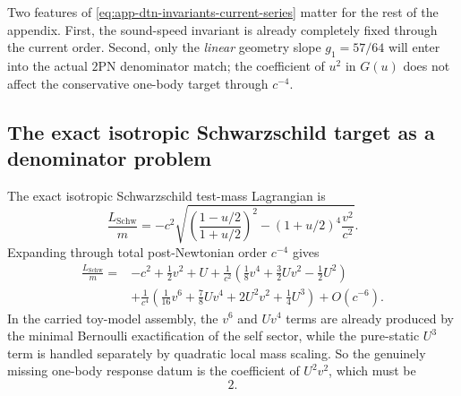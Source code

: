 \documentclass[11pt]{article}
\newcommand{\TwoPN}{\mathrm{2PN}}
\begin{document}
Two features of \cref{eq:app-dtn-invariants-current-series} matter for the rest of the
appendix.  First, the sound-speed invariant is already completely fixed through the
current order.  Second, only the \emph{linear} geometry slope \(g_1=57/64\) will enter
into the actual \(\TwoPN\) denominator match; the coefficient of \(u^2\) in
\(G(u)\) does not affect the conservative one-body target through \(c^{-4}\).

\subsection{The exact isotropic Schwarzschild target as a denominator problem}
\label{app:one-body-dtn-target}

The exact isotropic Schwarzschild test-mass Lagrangian is
\begin{equation}
\frac{L_{\mathrm{Schw}}}{m}
=-c^2\sqrt{\left(\frac{1-u/2}{1+u/2}\right)^2-(1+u/2)^4\frac{v^2}{c^2}}.
\label{eq:app-dtn-schwarzschild-exact}
\end{equation}
Expanding through total post-Newtonian order \(c^{-4}\) gives
\begin{align}
\frac{L_{\mathrm{Schw}}}{m}
={}&-c^2
+\frac12v^2+U
+\frac{1}{c^2}\left(\frac18v^4+\frac32Uv^2-\frac12U^2\right)
\nonumber\\
&
+\frac{1}{c^4}\left(\frac1{16}v^6+\frac78Uv^4+2U^2v^2+\frac14U^3\right)
+O(c^{-6}).
\label{eq:app-dtn-schwarzschild-2pn}
\end{align}
In the carried toy-model assembly, the \(v^6\) and \(Uv^4\) terms are already produced
by the minimal Bernoulli exactification of the self sector, while the pure-static
\(U^3\) term is handled separately by quadratic local mass scaling.  So the genuinely
missing one-body response datum is the coefficient of \(U^2v^2\), which must be
\begin{equation}
2.
\label{eq:app-dtn-target-u2v2}
\end{equation}
\end{document}

